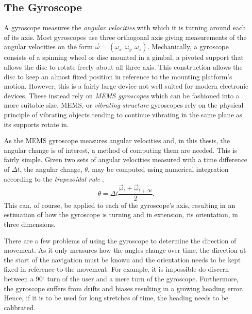 \documentclass{LTHthesis}
\begin{document}
\subsection{The Gyroscope}
%
A gyroscope measures the \emph{angular velocities} with which it is turning around each of its axis. Most gyroscopes use three orthogonal axis giving measurements of the angular velocities on the form $\vec\omega = (\omega_x \hspace{5pt} \omega_y \hspace{5pt} \omega_z)$.  Mechanically, a gyroscope consists of a spinning wheel or disc mounted in a gimbal, a pivoted support that allows the disc to rotate freely about all three axis. This construction allows the disc to keep an almost fixed position in reference to the mounting platform's motion. However, this is a fairly large device not well suited for modern electronic devices. These instead rely on \emph{MEMS gyroscopes} which can be fashioned into a more suitable size. MEMS, or \emph{vibrating structure} gyroscopes rely on the physical principle of vibrating objects tending to continue vibrating in the same plane as its supports rotate in.  

As the MEMS gyroscope measures angular velocities and, in this thesis, the angular change is of interest, a method of computing them are needed. This is fairly simple. Given two sets of angular velocities measured with a time difference of $\Delta t$, the angular change, $\theta$, may be computed using  numerical integration according to the \emph{trapezoidal rule} \cite{analysis},  
\begin{equation}
\theta=\Delta t \frac{\vec \omega _t +\vec \omega _{t+\Delta t}}{2}.\label{eq:trapetzoidal}
\end{equation} 
%
This can, of course, be applied to each of the gyroscope's axis, resulting in an estimation of how the gyroscope is turning and in extension, its orientation, in three dimensions. 

There are a few problems of using the gyroscope to determine the direction of movement. As it only measures how the angles change over time, the direction at the start of the navigation must be known and the orientation needs to be kept fixed in reference to the movement. For example, it is impossible do discern between a 90$^\circ$ turn of the user and a mere turn of the gyroscope.  Furthermore, the gyroscope suffers from drifts and biases resulting in a growing heading error. Hence, if it is to be used for long stretches of time, the heading needs to be calibrated.
%
\end{document}
